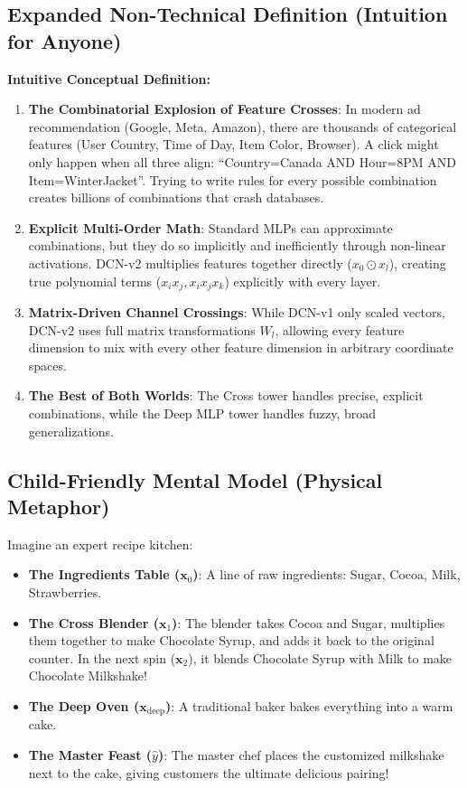 \documentclass[11pt,a4paper]{article}
\theoremstyle{definition}
\begin{document}
\subsection{Expanded Non-Technical Definition (Intuition for Anyone)}
\textbf{Intuitive Conceptual Definition:}
\begin{enumerate}
    \item \textbf{The Combinatorial Explosion of Feature Crosses}: In modern ad recommendation (Google, Meta, Amazon), there are thousands of categorical features (User Country, Time of Day, Item Color, Browser). A click might only happen when all three align: ``Country=Canada AND Hour=8PM AND Item=WinterJacket''. Trying to write rules for every possible combination creates billions of combinations that crash databases.
    \item \textbf{Explicit Multi-Order Math}: Standard MLPs can approximate combinations, but they do so implicitly and inefficiently through non-linear activations. DCN-v2 multiplies features together directly ($x_0 \odot x_l$), creating true polynomial terms ($x_i x_j, x_i x_j x_k$) explicitly with every layer.
    \item \textbf{Matrix-Driven Channel Crossings}: While DCN-v1 only scaled vectors, DCN-v2 uses full matrix transformations $W_l$, allowing every feature dimension to mix with every other feature dimension in arbitrary coordinate spaces.
    \item \textbf{The Best of Both Worlds}: The Cross tower handles precise, explicit combinations, while the Deep MLP tower handles fuzzy, broad generalizations.
\end{enumerate}

\subsection{Child-Friendly Mental Model (Physical Metaphor)}
Imagine an expert recipe kitchen:
\begin{itemize}
    \item \textbf{The Ingredients Table ($\mathbf{x}_0$)}: A line of raw ingredients: Sugar, Cocoa, Milk, Strawberries.
    \item \textbf{The Cross Blender ($\mathbf{x}_1$)}: The blender takes Cocoa and Sugar, multiplies them together to make Chocolate Syrup, and adds it back to the original counter. In the next spin ($\mathbf{x}_2$), it blends Chocolate Syrup with Milk to make Chocolate Milkshake!
    \item \textbf{The Deep Oven ($\mathbf{x}_{\text{deep}}$)}: A traditional baker bakes everything into a warm cake.
    \item \textbf{The Master Feast ($\widehat{y}$)}: The master chef places the customized milkshake next to the cake, giving customers the ultimate delicious pairing!
\end{itemize}
\end{document}

